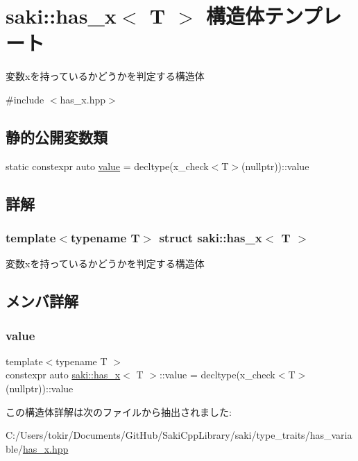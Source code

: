 \hypertarget{structsaki_1_1has__x}{}\section{saki\+:\+:has\+\_\+x$<$ T $>$ 構造体テンプレート}
\label{structsaki_1_1has__x}


変数xを持っているかどうかを判定する構造体  




{\ttfamily \#include $<$has\+\_\+x.\+hpp$>$}

\subsection*{静的公開変数類}
\begin{DoxyCompactItemize}
\item 
static constexpr auto \mbox{\hyperlink{structsaki_1_1has__x_aa3b89fa1981c7d31e7ec0c70ea01b451}{value}} = decltype(x\+\_\+check$<$T$>$(nullptr))\+::value
\end{DoxyCompactItemize}


\subsection{詳解}
\subsubsection*{template$<$typename T$>$\newline
struct saki\+::has\+\_\+x$<$ T $>$}

変数xを持っているかどうかを判定する構造体 

\subsection{メンバ詳解}
\mbox{\label{structsaki_1_1has__x_aa3b89fa1981c7d31e7ec0c70ea01b451}} 
\subsubsection{\texorpdfstring{value}{value}}
{\footnotesize\ttfamily template$<$typename T $>$ \\
constexpr auto \mbox{\hyperlink{structsaki_1_1has__x}{saki\+::has\+\_\+x}}$<$ T $>$\+::value = decltype(x\+\_\+check$<$T$>$(nullptr))\+::value\hspace{0.3cm}{\ttfamily [static]}}



この構造体詳解は次のファイルから抽出されました\+:\begin{DoxyCompactItemize}
\item 
C\+:/\+Users/tokir/\+Documents/\+Git\+Hub/\+Saki\+Cpp\+Library/saki/type\+\_\+traits/has\+\_\+variable/\mbox{\hyperlink{has__x_8hpp}{has\+\_\+x.\+hpp}}\end{DoxyCompactItemize}
